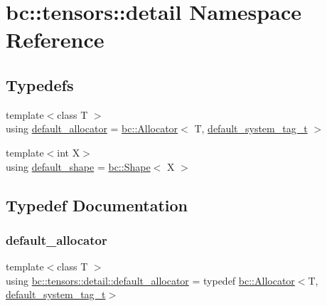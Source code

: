 \hypertarget{namespacebc_1_1tensors_1_1detail}{}\section{bc\+:\+:tensors\+:\+:detail Namespace Reference}
\label{namespacebc_1_1tensors_1_1detail}
\subsection*{Typedefs}
\begin{DoxyCompactItemize}
\item 
{\footnotesize template$<$class T $>$ }\\using \hyperlink{namespacebc_1_1tensors_1_1detail_a2f9f79ccf87ba1999f0d01623cf7e471}{default\+\_\+allocator} = \hyperlink{classbc_1_1allocators_1_1Allocator}{bc\+::\+Allocator}$<$ T, \hyperlink{namespacebc_afc523ebfb2766ca065901d60e7f58ede}{default\+\_\+system\+\_\+tag\+\_\+t} $>$
\item 
{\footnotesize template$<$int X$>$ }\\using \hyperlink{namespacebc_1_1tensors_1_1detail_aea990a08131aca54e30c234f68b18c73}{default\+\_\+shape} = \hyperlink{structbc_1_1Shape}{bc\+::\+Shape}$<$ X $>$
\end{DoxyCompactItemize}


\subsection{Typedef Documentation}
\mbox{\label{namespacebc_1_1tensors_1_1detail_a2f9f79ccf87ba1999f0d01623cf7e471}} 
\subsubsection{\texorpdfstring{default\+\_\+allocator}{default\_allocator}}
{\footnotesize\ttfamily template$<$class T $>$ \\
using \hyperlink{namespacebc_1_1tensors_1_1detail_a2f9f79ccf87ba1999f0d01623cf7e471}{bc\+::tensors\+::detail\+::default\+\_\+allocator} = typedef \hyperlink{classbc_1_1allocators_1_1Allocator}{bc\+::\+Allocator}$<$T, \hyperlink{namespacebc_afc523ebfb2766ca065901d60e7f58ede}{default\+\_\+system\+\_\+tag\+\_\+t}$>$}

